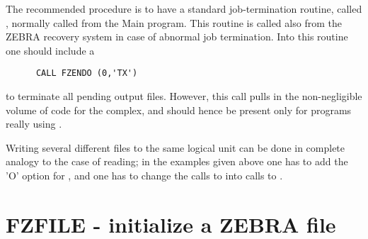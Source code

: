 The recommended procedure is to have a standard job-termination
routine, called ,
normally called from the Main program.
This routine is called also from the ZEBRA recovery system in case
of abnormal job termination.
Into this routine one should include a
\begin{verbatim}
      CALL FZENDO (0,'TX')
\end{verbatim}
to terminate all pending output files.
However, this call pulls in the non-negligible volume of code
for the  complex, and should hence be present only
for programs really using .

Writing several different files to the same logical unit
can be done in complete analogy to the case of reading;
in the examples given above one has to add the 'O' option
for ,
and one has to change the calls to  into calls to .

\section{FZFILE - initialize a ZEBRA file}

